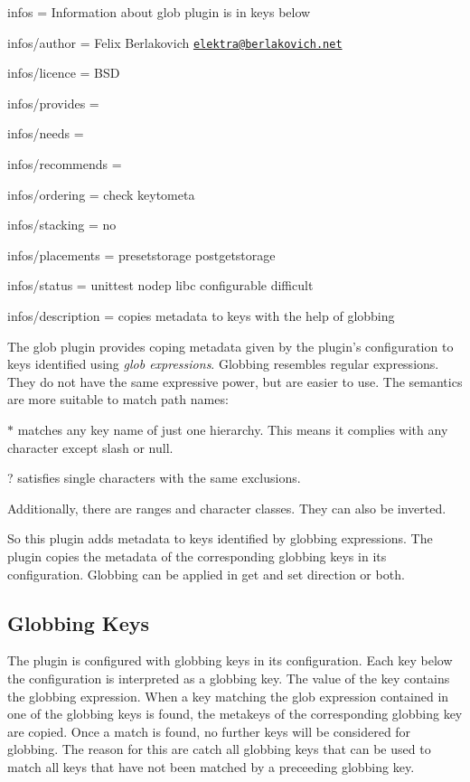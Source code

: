 
\begin{DoxyItemize}
\item infos = Information about glob plugin is in keys below
\item infos/author = Felix Berlakovich \href{mailto:elektra@berlakovich.net}{\tt elektra@berlakovich.\+net}
\item infos/licence = B\+S\+D
\item infos/provides =
\item infos/needs =
\item infos/recommends =
\item infos/ordering = check keytometa
\item infos/stacking = no
\item infos/placements = presetstorage postgetstorage
\item infos/status = unittest nodep libc configurable difficult
\item infos/description = copies metadata to keys with the help of globbing
\end{DoxyItemize}

The glob plugin provides coping metadata given by the plugin's configuration to keys identified using {\itshape glob expressions}. Globbing resembles regular expressions. They do not have the same expressive power, but are easier to use. The semantics are more suitable to match path names\+:


\begin{DoxyItemize}
\item {\ttfamily $\ast$} matches any key name of just one hierarchy. This means it complies with any character except slash or null.
\item {\ttfamily ?} satisfies single characters with the same exclusions.
\item Additionally, there are ranges and character classes. They can also be inverted.
\end{DoxyItemize}

So this plugin adds metadata to keys identified by globbing expressions. The plugin copies the metadata of the corresponding globbing keys in its configuration. Globbing can be applied in get and set direction or both.

\subsection*{Globbing Keys}

The plugin is configured with globbing keys in its configuration. Each key below the configuration is interpreted as a globbing key. The value of the key contains the globbing expression. When a key matching the glob expression contained in one of the globbing keys is found, the metakeys of the corresponding globbing key are copied. Once a match is found, no further keys will be considered for globbing. The reason for this are catch all globbing keys that can be used to match all keys that have not been matched by a preceeding globbing key.

